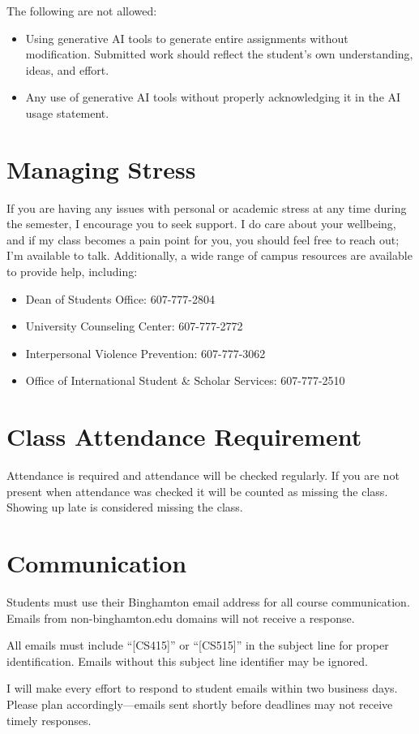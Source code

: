 \documentclass[11pt,article,oneside]{memoir} %
\begin{document}
The following are not allowed:

\begin{itemize}
    \item Using generative AI tools to generate entire assignments without modification. Submitted work should reflect the student's own understanding, ideas, and effort.
    \item Any use of generative AI tools without properly acknowledging it in the AI usage statement.
\end{itemize}


\section{Managing Stress}

If you are having any issues with personal or academic stress at any time during the semester, I encourage you to seek support.
I do care about your wellbeing, and if my class becomes a pain point for you, you should feel free to reach out; I'm available to talk.
Additionally, a wide range of campus resources are available to provide help, including:
\begin{itemize}
    \item Dean of Students Office: 607-777-2804
    \item University Counseling Center: 607-777-2772
    \item Interpersonal Violence Prevention: 607-777-3062
    \item Office of International Student \& Scholar Services: 607-777-2510
\end{itemize}

\section{Class Attendance Requirement}

Attendance is required and attendance will be checked regularly.
If you are not present when attendance was checked it will be counted as missing the class.
Showing up late is considered missing the class.

\section{Communication}

Students must use their Binghamton email address for all course communication.
Emails from non-binghamton.edu domains will not receive a response.

All emails must include ``[CS415]'' or ``[CS515]'' in the subject line for proper identification.
Emails without this subject line identifier may be ignored.

I will make every effort to respond to student emails within two business days.
Please plan accordingly—emails sent shortly before deadlines may not receive timely responses.
\end{document}
